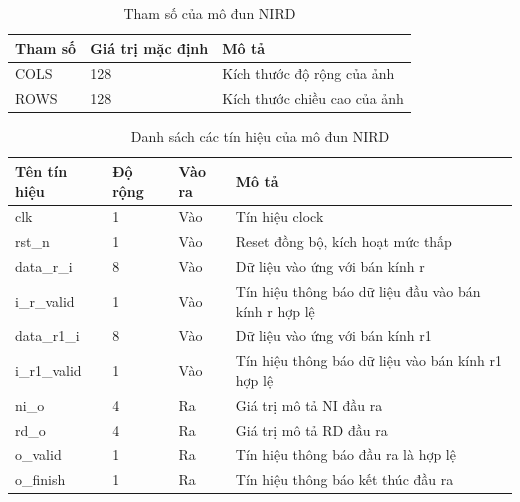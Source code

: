 \begin{table}[!ht]
    \centering
    \renewcommand{\arraystretch}{1.3} %
    \begin{tabular}{|p{3cm} p{4cm} p{8cm}|}
        \hline
        \rowcolor{gray!30}
        \textbf{Tham số } & \textbf{Giá trị mặc định}  & \textbf{Mô tả} \\
        \hline
        COLS & 128 & Kích thước độ rộng của ảnh
        \\ \hline
        ROWS & 128 & Kích thước chiều cao của ảnh
        \\
        \hline
    \end{tabular}
    \caption{Tham số của mô đun NIRD}
    \label{tab:paramListNIRD}
\end{table}
\begin{table}[!ht]
    \centering
    \renewcommand{\arraystretch}{1.3} %
    \begin{tabular}{|p{3cm} p{2cm} p{2cm} p{8cm}|}
        \hline
        \rowcolor{gray!30}
        \textbf{Tên tín hiệu} & \textbf{Độ rộng} & \textbf{Vào ra} & \textbf{Mô tả} \\
        \hline
        clk & 1 & Vào & Tín hiệu clock \\
        \hline
        rst\_n & 1 & Vào & Reset đồng bộ, kích hoạt mức thấp \\
        \hline 
        data\_r\_i & 8  & Vào &  Dữ liệu vào ứng với bán kính r
        \\ \hline
        i\_r\_valid & 1 & Vào & Tín hiệu thông báo dữ liệu đầu vào bán kính r hợp lệ
        \\ \hline
        data\_r1\_i & 8 & Vào & Dữ liệu vào ứng với bán kính r1
        \\ \hline
        i\_r1\_valid & 1 & Vào & Tín hiệu thông báo dữ liệu vào bán kính r1 hợp lệ
        \\ \hline
        ni\_o & 4 & Ra & Giá trị mô tả NI đầu ra
        \\ \hline
        rd\_o & 4 & Ra & Giá trị mô tả RD đầu ra
        \\ \hline
        o\_valid & 1 & Ra & Tín hiệu thông báo đầu ra là hợp lệ
        \\ \hline
        o\_finish & 1 & Ra & Tín hiệu thông báo kết thúc đầu ra
        \\ \hline
       
    \end{tabular}
    \caption{Danh sách các tín hiệu của mô đun NIRD}
    \label{tab:signalListNIRD}
\end{table}

